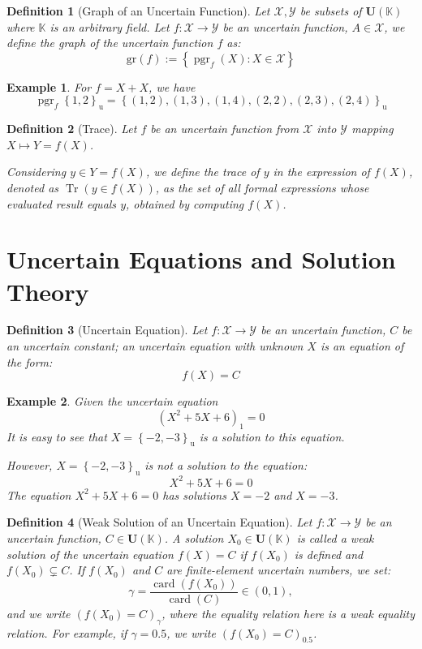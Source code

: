 \documentclass[a4paper,12pt, twoside]{memoir}
\newtheorem{definition}{Definition}[chapter]
\newtheorem{example}{Example}[chapter]
\DeclareMathOperator{\Tr}{Tr}
\DeclareMathOperator{\card}{card}
\DeclareMathOperator{\pgr}{pgr}
\newcommand{\set}[1]{\left\{#1\right\}} %
\newcommand{\s}[1]{\set{#1}_\mathrm{u}} %
\newcommand{\tsbd}[1]{\mathbf{U}(\mathbb{#1})}
\newcommand{\gtcl}[2]{\left(#1\right)_{#2}} %
\newcommand{\gr}[1]{\text{gr}(#1)} %
\newcommand{\kgdd}[1]{\left(#1\right)_1} %
\begin{document}
\begin{definition}[Graph of an Uncertain Function]
	Let $\mathcal{X} ,\mathcal{Y}$ be subsets of $\tsbd{K}$ where $\mathbb{K}$ is an arbitrary field.
	Let $f : \mathcal{X} \to \mathcal{Y}$ be an uncertain function, $A \in \mathcal{X}$, we define the graph of the uncertain function $f$ as:
	\[\gr{f}:= \set{\pgr_f(X) : X \in \mathcal{X}}\]
\end{definition}

\begin{example}
	For $f = X+X$, we have \[\pgr_f{\s{1,2}} = \s{(1,2),(1,3),(1,4),(2,2),(2,3),(2,4)}\]
\end{example}

\begin{definition}[Trace]
	Let $f$ be an uncertain function from $\mathcal{X}$ into $\mathcal{Y}$ mapping $X \mapsto Y = f(X)$.

	Considering $y \in Y = f(X)$, we define the trace of $y$ in the expression of $f(X)$, denoted as $\Tr(y \in f(X))$, as the set of all formal expressions whose evaluated result equals $y$, obtained by computing $f(X)$.
\end{definition}

\section{Uncertain Equations and Solution Theory}

\begin{definition}[Uncertain Equation]
	Let $f : \mathcal{X}\to \mathcal{Y}$ be an uncertain function, $C$ be an uncertain constant; an uncertain equation with unknown $X$ is an equation of the form: \[f(X) = C\]
\end{definition}

\begin{example}
	Given the uncertain equation \[\kgdd{X^2+5X+6} = 0 \]
	It is easy to see that $X = \s{-2,-3}$ is a solution to this equation.

	However, $X = \s{-2,-3}$ is not a solution to the equation:
	\[X^2+5X+6 = 0 \]
	The equation $X^2+5X+6 = 0$ has solutions $X=-2$ and $X=-3$.
\end{example}

\begin{definition}[Weak Solution of an Uncertain Equation]
	Let $f : \mathcal{X} \to \mathcal{Y}$ be an uncertain function, $C \in \tsbd{K}$.
	A solution $X_0 \in \tsbd{K}$ is called a weak solution of the uncertain equation $f(X) = C$ if $f(X_0)$ is defined and $f(X_0) \subsetneq C$. If $f(X_0)$ and $C$ are finite-element uncertain numbers, we set: \[\gamma = \frac{\card(f(X_0))}{\card(C)} \in (0,1),\] and we write $(f(X_0) = C)_\gamma$, where the equality relation here is a weak equality relation. For example, if $\gamma = 0.5$, we write $\gtcl{f(X_0) = C}{0.5}$.
\end{definition}
\end{document}
